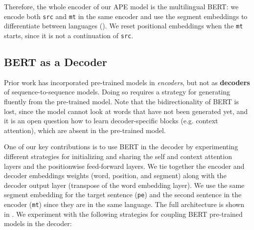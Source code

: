 Therefore, the whole encoder of our APE model is the multilingual
BERT: we encode both {\tt src} and {\tt mt} in the same encoder and
use the segment embeddings to differentiate between languages
(). We reset positional
embeddings when the {\tt mt} starts, since it is not a continuation
of {\tt src}.

\subsection{BERT as a Decoder}\label{sec:ape_bert_decoder}

Prior work has incorporated pre-trained models in {\it encoders}, but
not as {\bf decoders} of sequence-to-sequence models. Doing so
requires a strategy for generating fluently from the pre-trained
model. Note that the bidirectionality of BERT is lost, since the
model cannot look at words that have not been generated yet, and it
is an open question how to learn decoder-specific blocks (e.g.
context attention), which are absent in the pre-trained model.

One of our key contributions is to use BERT in the decoder by
experimenting different strategies for initializing and sharing the
self and context attention layers and the positionwise feed-forward
layers. We tie together the encoder and decoder embeddings weights
(word, position, and segment) along with the decoder output layer
(transpose of the word embedding layer). We use the same segment
embedding for the target sentence ({\tt pe}) and the second sentence
in the encoder ({\tt mt}) since they are in the same language. The
full architecture is shown in .
We experiment with the following strategies for coupling BERT
pre-trained models in the decoder:

